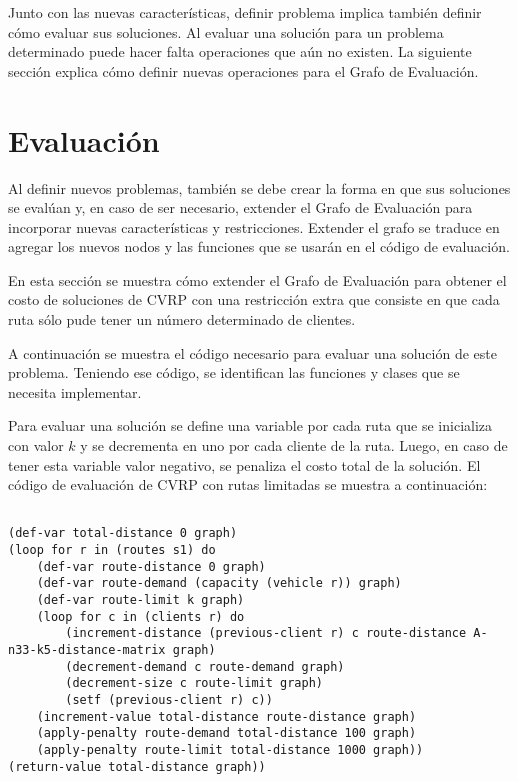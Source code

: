 Junto con las nuevas características, definir problema implica también definir cómo evaluar sus soluciones. Al evaluar una solución para un problema determinado puede hacer falta operaciones que aún no existen. La siguiente sección explica cómo definir nuevas operaciones para el Grafo de Evaluación.

\section{Evaluación}\label{4-eval}

Al definir nuevos problemas, también se debe crear la forma en que sus soluciones se evalúan y, en caso de ser necesario, extender el Grafo de Evaluación para incorporar nuevas características y restricciones. Extender el grafo se traduce en agregar los nuevos nodos y las funciones que se usarán en el código de evaluación.

En esta sección se muestra cómo extender el Grafo de Evaluación para obtener el costo de soluciones de CVRP con una restricción extra que consiste en que cada ruta sólo pude tener un número determinado de clientes.

A continuación se muestra el código necesario para evaluar una solución de este problema. Teniendo ese código, se identifican las funciones y clases que se necesita implementar.

Para evaluar una solución se define una variable por cada ruta que se inicializa con valor $k$ y se decrementa en uno por cada cliente de la ruta. Luego, en caso de tener esta variable valor negativo, se penaliza el costo total de la solución. El código de evaluación de CVRP con rutas limitadas se muestra a continuación:

\begin{lstlisting}

(def-var total-distance 0 graph)
(loop for r in (routes s1) do
	(def-var route-distance 0 graph)
	(def-var route-demand (capacity (vehicle r)) graph) 
	(def-var route-limit k graph)
	(loop for c in (clients r) do
		(increment-distance (previous-client r) c route-distance A-n33-k5-distance-matrix graph)
		(decrement-demand c route-demand graph) 
		(decrement-size c route-limit graph) 
		(setf (previous-client r) c))
	(increment-value total-distance route-distance graph)
	(apply-penalty route-demand total-distance 100 graph) 
	(apply-penalty route-limit total-distance 1000 graph)) 
(return-value total-distance graph))
\end{lstlisting}

